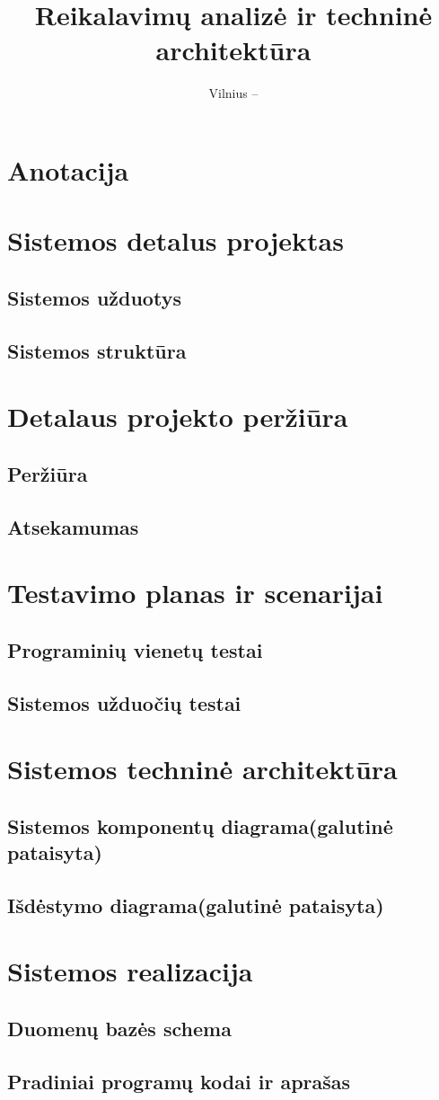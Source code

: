 \documentclass[oneside]{VUMIFPSkursinis}
\title{Reikalavimų analizė ir techninė architektūra}
\date{Vilnius – \the\year}
\begin{document}
\maketitle
\tableofcontents

\section{Anotacija}

\section{Sistemos detalus projektas}
	\subsection{Sistemos užduotys}
	\subsection{Sistemos struktūra}

\section{Detalaus projekto peržiūra}
	\subsection{Peržiūra}
	\subsection{Atsekamumas}

\section{Testavimo planas ir scenarijai}
	\subsection{Programinių vienetų testai}
	\subsection{Sistemos užduočių testai}

\section{Sistemos techninė architektūra}
	\subsection{Sistemos komponentų diagrama(galutinė pataisyta)}
	\subsection{Išdėstymo diagrama(galutinė pataisyta)}




\section{Sistemos realizacija}
	\subsection{Duomenų bazės schema}
	\subsection{Pradiniai programų kodai ir aprašas}
\end{document}
